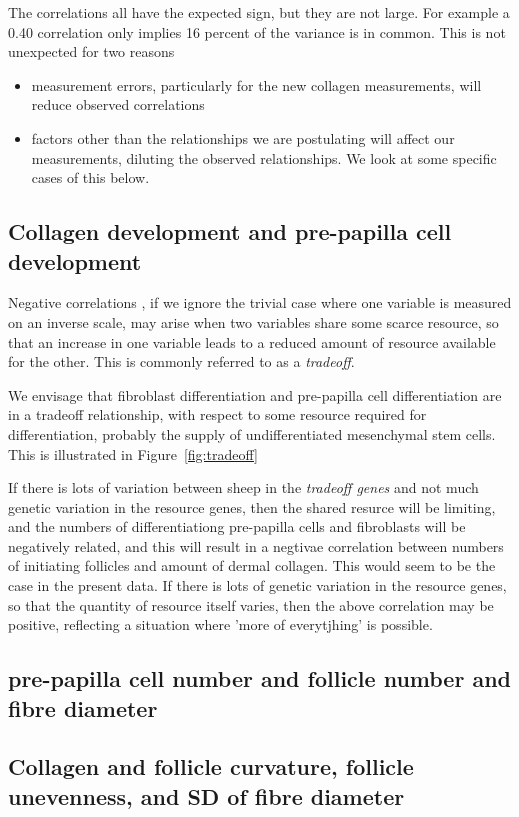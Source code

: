 \documentclass[titlepage]{article}  %
\begin{document}
The correlations all have the expected sign, but they are not large. For example a 0.40 correlation only implies 16 percent of the variance is in common. This is not unexpected for two reasons
\begin{itemize}
\item measurement errors, particularly for the new collagen measurements, will reduce observed correlations
\item factors other than the relationships we are postulating will affect our measurements, diluting the observed relationships. We look at some specific cases of this below.
\end{itemize}

\subsection{Collagen development and pre-papilla cell development}
Negative correlations , if we ignore the trivial case where one variable is measured on an inverse scale, may arise when two variables share some scarce resource, so that an increase in one variable leads to a reduced amount of resource available for the other. This is commonly referred to as a {\em tradeoff}.

We envisage that fibroblast differentiation and pre-papilla cell differentiation are in a tradeoff relationship, with respect to some resource required for differentiation, probably the supply of undifferentiated mesenchymal stem cells. This is illustrated in Figure~\ref{fig:tradeoff}


If there is lots of variation between sheep in the {\em tradeoff genes} and not much genetic variation in the resource genes, then the shared resurce will be limiting, and the numbers of differentiationg pre-papilla cells and fibroblasts will be negatively related, and this will result in a negtivae correlation between numbers of initiating follicles and amount of dermal collagen. This would seem to be the case in the present data. If there is lots of genetic variation in the resource genes, so that the quantity of resource itself varies, then the above correlation may be positive, reflecting a situation where 'more of everytjhing' is possible. 

\subsection{pre-papilla cell number and follicle number and fibre diameter}
\subsection{Collagen and follicle curvature, follicle unevenness, and SD of fibre diameter}
\end{document}
